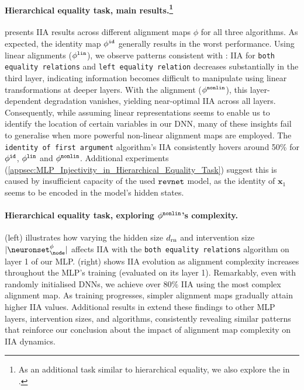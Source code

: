 \documentclass{article}
\newcommand{\bx}{\mathbf{x}}
\newcommand{\algname}[1]{\texttt{\fontsize{9pt}{9pt}\selectfont#1}}
\newcommand{\algbothequality}{\algname{both equality relations}\xspace}
\newcommand{\algleftequality}{\algname{left equality relation}\xspace}
\newcommand{\algidentityoffirst}{\algname{identity of first argument}\xspace}
\newcommand{\causalmap}{\phi}
\newcommand{\interventionsize}{\lvert \neuronset^{\causalmap}_\node \rvert}
\begin{document}
\vspace{-1pt}
\paragraph{Hierarchical equality task, main results.\footnote{As an additional task similar to hierarchical equality, we also explore the  in .}}
 presents IIA results across different alignment maps $\phi$ for all three algorithms. 
As expected, the identity map $\causalmapidentity$ generally results in the worst performance.
Using linear alignments ($\Rotation$), we observe patterns consistent with \citet{Geiger2023FindingAB}: 
IIA for \algbothequality and \algleftequality decreases substantially in the third layer, indicating information becomes difficult to manipulate using linear transformations at deeper layers.
With the \nonlinearname alignment ($\RevNet$), this layer-dependent degradation vanishes, yielding near-optimal IIA across all layers.
Consequently, while assuming linear representations seems to enable us to identify the location of certain variables in our DNN, many of these insights fail to generalise when more powerful non-linear alignment maps are employed.
The \algidentityoffirst algorithm's IIA consistently hovers around 50\% for $\causalmapidentity$, $\Rotation$ and $\RevNet$. 
Additional experiments (\cref{appsec:MLP_Injectivity_in_Hierarchical_Equality_Task}) suggest this is caused by insufficient capacity of the used $\mathtt{revnet}$ model, as the identity of $\bx_1$ seems to be encoded in the model's hidden states.

\vspace{-1pt}
\paragraph{Hierarchical equality task, exploring $\RevNet$'s complexity.}
 (left) illustrates how varying the hidden size $d_{\mathrm{rn}}$ and intervention size $\interventionsize$ affects IIA with the \algbothequality algorithm on layer 1 of our MLP.
 (right) shows IIA evolution as alignment complexity increases throughout the MLP's training (evaluated on its layer 1).
Remarkably, even with randomly initialised DNNs, we achieve over $80\%$ IIA using the most complex alignment map.
As training progresses, simpler alignment maps gradually attain higher IIA values.
Additional results in  extend these findings to other MLP layers, intervention sizes, and algorithms, consistently revealing similar patterns that reinforce our conclusion about the impact of alignment map complexity on IIA dynamics.
\end{document}
